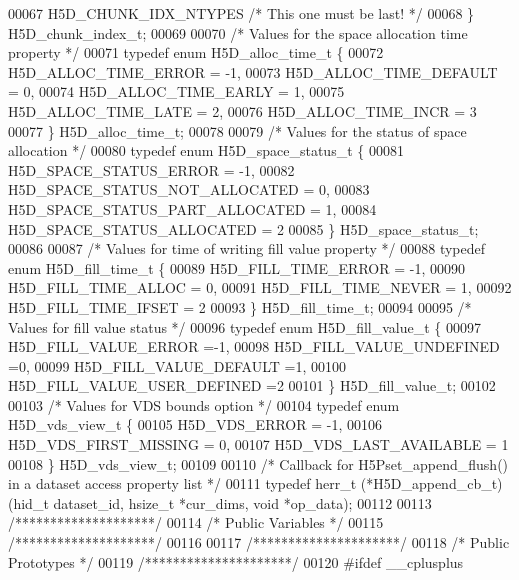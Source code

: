 \begin{DoxyCode}
00067     H5D\_CHUNK\_IDX\_NTYPES        \textcolor{comment}{/* This one must be last!                   */}
00068 \} H5D\_chunk\_index\_t;
00069 
00070 \textcolor{comment}{/* Values for the space allocation time property */}
00071 \textcolor{keyword}{typedef} \textcolor{keyword}{enum} H5D\_alloc\_time\_t \{
00072     H5D\_ALLOC\_TIME\_ERROR    = -1,
00073     H5D\_ALLOC\_TIME\_DEFAULT      = 0,
00074     H5D\_ALLOC\_TIME\_EARLY    = 1,
00075     H5D\_ALLOC\_TIME\_LATE     = 2,
00076     H5D\_ALLOC\_TIME\_INCR     = 3
00077 \} H5D\_alloc\_time\_t;
00078 
00079 \textcolor{comment}{/* Values for the status of space allocation */}
00080 \textcolor{keyword}{typedef} \textcolor{keyword}{enum} H5D\_space\_status\_t \{
00081     H5D\_SPACE\_STATUS\_ERROR      = -1,
00082     H5D\_SPACE\_STATUS\_NOT\_ALLOCATED  = 0,
00083     H5D\_SPACE\_STATUS\_PART\_ALLOCATED = 1,
00084     H5D\_SPACE\_STATUS\_ALLOCATED      = 2
00085 \} H5D\_space\_status\_t;
00086 
00087 \textcolor{comment}{/* Values for time of writing fill value property */}
00088 \textcolor{keyword}{typedef} \textcolor{keyword}{enum} H5D\_fill\_time\_t \{
00089     H5D\_FILL\_TIME\_ERROR = -1,
00090     H5D\_FILL\_TIME\_ALLOC = 0,
00091     H5D\_FILL\_TIME\_NEVER = 1,
00092     H5D\_FILL\_TIME\_IFSET = 2
00093 \} H5D\_fill\_time\_t;
00094 
00095 \textcolor{comment}{/* Values for fill value status */}
00096 \textcolor{keyword}{typedef} \textcolor{keyword}{enum} H5D\_fill\_value\_t \{
00097     H5D\_FILL\_VALUE\_ERROR        =-1,
00098     H5D\_FILL\_VALUE\_UNDEFINED    =0,
00099     H5D\_FILL\_VALUE\_DEFAULT      =1,
00100     H5D\_FILL\_VALUE\_USER\_DEFINED =2
00101 \} H5D\_fill\_value\_t;
00102 
00103 \textcolor{comment}{/* Values for VDS bounds option */}
00104 \textcolor{keyword}{typedef} \textcolor{keyword}{enum} H5D\_vds\_view\_t \{
00105     H5D\_VDS\_ERROR               = -1,
00106     H5D\_VDS\_FIRST\_MISSING       = 0,
00107     H5D\_VDS\_LAST\_AVAILABLE      = 1
00108 \} H5D\_vds\_view\_t;
00109 
00110 \textcolor{comment}{/* Callback for H5Pset\_append\_flush() in a dataset access property list */}
00111 \textcolor{keyword}{typedef} herr\_t (*H5D\_append\_cb\_t)(hid\_t dataset\_id, hsize\_t *cur\_dims, \textcolor{keywordtype}{void} *op\_data);
00112 
00113 \textcolor{comment}{/********************/}
00114 \textcolor{comment}{/* Public Variables */}
00115 \textcolor{comment}{/********************/}
00116 
00117 \textcolor{comment}{/*********************/}
00118 \textcolor{comment}{/* Public Prototypes */}
00119 \textcolor{comment}{/*********************/}
00120 \textcolor{preprocessor}{#ifdef \_\_cplusplus}

\end{DoxyCode}
